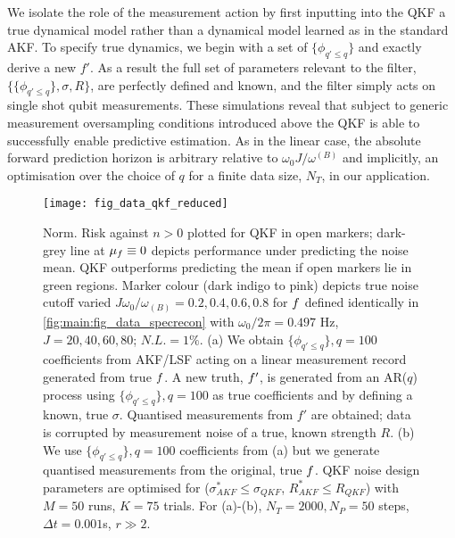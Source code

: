 We isolate the role of the measurement action by first inputting into the QKF a true dynamical model rather than a dynamical model learned as in the standard AKF.  To specify true dynamics, we begin with a set of $\{ \phi_{q'\leq q}\}$ and exactly derive a new $f'$.  As a result the full set of parameters relevant to the filter, $\{\{\phi_{q' \leq q} \}, \sigma, R\}$, are perfectly defined and known, and the filter simply acts on single shot qubit measurements.  These simulations reveal that subject to generic measurement oversampling conditions introduced above the QKF is able to successfully enable predictive estimation.  As in the linear case, the absolute forward prediction horizon is arbitrary relative to $\omega_0 J / \omega^{(B)}$ and implicitly, an optimisation over the choice of $q$ for a finite data size, $N_T$,  in our application. 

\begin{figure}[h!]
	\texttt{[image: fig\_data\_qkf\_reduced]}
	\caption{\label{fig:main:fig_data_qkf2}Norm. Risk against $n>0$ plotted for QKF in open markers; dark-grey line at $\mu_f \equiv 0$ depicts performance under predicting the noise mean. QKF outperforms predicting the mean if open markers lie in green regions. Marker colour (dark indigo to pink) depicts true noise cutoff varied $J \omega_0 / \omega_{(B)} = 0.2, 0.4, 0.6, 0.8$ for $f$ defined identically in  \cref{fig:main:fig_data_specrecon} with $\omega_0/ 2\pi = 0.497 $ Hz, $J = 20, 40, 60, 80$;  $N.L. = 1 \%$. (a) We obtain $\{\phi_{q' \leq q}\}, q=100$ coefficients from AKF/LSF acting on a linear measurement record generated from true $f$. A new truth, $f'$, is generated from an AR($q$) process using $\{\phi_{q'\leq q}\}, q=100$ as true coefficients and by defining a known, true $\sigma$. Quantised measurements from $f'$ are obtained; data is corrupted by measurement noise of a true, known strength $R$. (b) We use $\{\phi_{q' \leq q} \}, q=100$ coefficients from (a) but we generate quantised measurements from the original, true $f$. QKF noise design parameters are optimised for ($\sigma_{AKF}^* \leq \sigma_{QKF}$, $R_{AKF}^* \leq R_{QKF}$) with $M=50$ runs, $K=75$ trials. For (a)-(b), $N_T = 2000, N_P = 50$ steps, $\Delta t = 0.001$s, $r\gg 2$.}
\end{figure}


